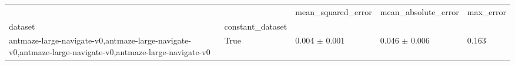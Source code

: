 \begin{tabular}{lllll}
\toprule
 &  & mean_squared_error & mean_absolute_error & max_error \\
dataset & constant_dataset &  &  &  \\
\midrule
antmaze-large-navigate-v0,antmaze-large-navigate-v0,antmaze-large-navigate-v0,antmaze-large-navigate-v0 & True & 0.004 $\pm$ 0.001 & 0.046 $\pm$ 0.006 & 0.163 \\
\cline{1-5}
\bottomrule
\end{tabular}
